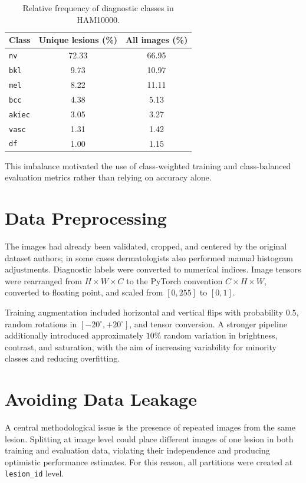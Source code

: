 \documentclass[11pt,a4paper]{article}
\begin{document}
\begin{table}[H]
\centering
\small
\caption{Relative frequency of diagnostic classes in HAM10000.}
\label{tab:freq}
\begin{tabular}{lcc}
\toprule
\textbf{Class} & \textbf{Unique lesions (\%)} & \textbf{All images (\%)} \\
\midrule
\texttt{nv} & 72.33 & 66.95 \\
\texttt{bkl} & 9.73 & 10.97 \\
\texttt{mel} & 8.22 & 11.11 \\
\texttt{bcc} & 4.38 & 5.13 \\
\texttt{akiec} & 3.05 & 3.27 \\
\texttt{vasc} & 1.31 & 1.42 \\
\texttt{df} & 1.00 & 1.15 \\
\bottomrule
\end{tabular}
\end{table}

This imbalance motivated the use of class-weighted training and class-balanced evaluation metrics rather than relying on accuracy alone.

\section{Data Preprocessing}
The images had already been validated, cropped, and centered by the original dataset authors; in some cases dermatologists also performed manual histogram adjustments. Diagnostic labels were converted to numerical indices. Image tensors were rearranged from $H\times W\times C$ to the PyTorch convention $C\times H\times W$, converted to floating point, and scaled from $[0,255]$ to $[0,1]$.

Training augmentation included horizontal and vertical flips with probability $0.5$, random rotations in $[-20^\circ,+20^\circ]$, and tensor conversion. A stronger pipeline additionally introduced approximately $10\%$ random variation in brightness, contrast, and saturation, with the aim of increasing variability for minority classes and reducing overfitting.

\section{Avoiding Data Leakage}
A central methodological issue is the presence of repeated images from the same lesion. Splitting at image level could place different images of one lesion in both training and evaluation data, violating their independence and producing optimistic performance estimates. For this reason, all partitions were created at \texttt{lesion\_id} level.
\end{document}
